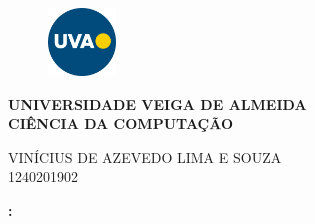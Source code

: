 \begin{titlepage}
    
    \centering
    
    \begin{figure}[h]
        \centering
        \includegraphics[width=1.8cm]{Figuras/uva.png}
    \end{figure}
        
    \textbf{
        \uppercase{
            Universidade Veiga de Almeida \\
            Ciência da Computação
        }
    }
    \vspace{5 em}

    VINÍCIUS DE AZEVEDO LIMA E SOUZA \\
    1240201902 
    
    \vfill

    \textbf{\uppercase\expandafter{\expanded{\TitleName}:}} \\
    \SubtitleName
    
        
    \vfill 
        
    \printCity \\
    \the \year

\end{titlepage}

